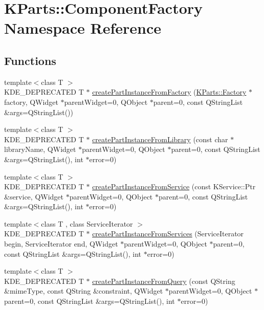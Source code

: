 \hypertarget{namespaceKParts_1_1ComponentFactory}{\section{\-K\-Parts\-:\-:\-Component\-Factory \-Namespace \-Reference}
\label{namespaceKParts_1_1ComponentFactory}
}
\subsection*{\-Functions}
\begin{DoxyCompactItemize}
\item 
{\footnotesize template$<$class T $>$ }\\\-K\-D\-E\-\_\-\-D\-E\-P\-R\-E\-C\-A\-T\-E\-D \-T $\ast$ \hyperlink{namespaceKParts_1_1ComponentFactory_a912a99f55a6cd314f0519bdc8b6b53be}{create\-Part\-Instance\-From\-Factory} (\hyperlink{classKParts_1_1Factory}{\-K\-Parts\-::\-Factory} $\ast$factory, \-Q\-Widget $\ast$parent\-Widget=0, \-Q\-Object $\ast$parent=0, const \-Q\-String\-List \&args=\-Q\-String\-List())
\item 
{\footnotesize template$<$class T $>$ }\\\-K\-D\-E\-\_\-\-D\-E\-P\-R\-E\-C\-A\-T\-E\-D \-T $\ast$ \hyperlink{namespaceKParts_1_1ComponentFactory_a9fbd68a5b3a1e872dd6ae181fff65136}{create\-Part\-Instance\-From\-Library} (const char $\ast$library\-Name, \-Q\-Widget $\ast$parent\-Widget=0, \-Q\-Object $\ast$parent=0, const \-Q\-String\-List \&args=\-Q\-String\-List(), int $\ast$error=0)
\item 
{\footnotesize template$<$class T $>$ }\\\-K\-D\-E\-\_\-\-D\-E\-P\-R\-E\-C\-A\-T\-E\-D \-T $\ast$ \hyperlink{namespaceKParts_1_1ComponentFactory_a85bb410165e80f12e79a45c2e3ab39ce}{create\-Part\-Instance\-From\-Service} (const \-K\-Service\-::\-Ptr \&service, \-Q\-Widget $\ast$parent\-Widget=0, \-Q\-Object $\ast$parent=0, const \-Q\-String\-List \&args=\-Q\-String\-List(), int $\ast$error=0)
\item 
{\footnotesize template$<$class T , class Service\-Iterator $>$ }\\\-K\-D\-E\-\_\-\-D\-E\-P\-R\-E\-C\-A\-T\-E\-D \-T $\ast$ \hyperlink{namespaceKParts_1_1ComponentFactory_ad56c0a6af0a338e56dc3e2613073b195}{create\-Part\-Instance\-From\-Services} (\-Service\-Iterator begin, \-Service\-Iterator end, \-Q\-Widget $\ast$parent\-Widget=0, \-Q\-Object $\ast$parent=0, const \-Q\-String\-List \&args=\-Q\-String\-List(), int $\ast$error=0)
\item 
{\footnotesize template$<$class T $>$ }\\\-K\-D\-E\-\_\-\-D\-E\-P\-R\-E\-C\-A\-T\-E\-D \-T $\ast$ \hyperlink{namespaceKParts_1_1ComponentFactory_aaa10d0b82f1e3de6e36eae47b8c8aa17}{create\-Part\-Instance\-From\-Query} (const \-Q\-String \&mime\-Type, const \-Q\-String \&constraint, \-Q\-Widget $\ast$parent\-Widget=0, \-Q\-Object $\ast$parent=0, const \-Q\-String\-List \&args=\-Q\-String\-List(), int $\ast$error=0)
\end{DoxyCompactItemize}


